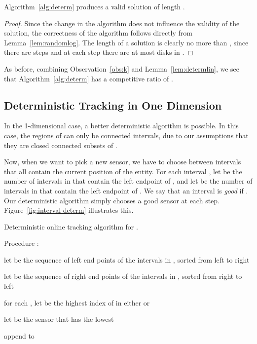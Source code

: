 \documentclass[runningheads]{llncs}
\begin{document}
      \begin {lemma} \label {lem:determlin}
        Algorithm~\ref {alg:determ} produces a valid solution of length .
      \end {lemma}
      
      \begin {proof}
        Since the change in the algorithm does not influence the validity of the solution, the correctness of the algorithm follows directly from Lemma~\ref {lem:randomlog}.
        The length of a solution is clearly no more than , since there are  steps and at each step there are at most  disks in .
      \end {proof}

      As before, combining Observation~\ref {obs:k} and Lemma~\ref {lem:determlin}, we see that Algorithm~\ref {alg:determ} has a competitive ratio of .
       
 \subsection {Deterministic Tracking in One Dimension}
In the 1-dimensional case, a better deterministic algorithm is possible. In this case, the regions of  can only be connected intervals, due to our assumptions that they are closed connected subsets of .
            
Now, when we want to pick a new sensor, we have to choose between  intervals that all contain the current position of the entity. For each interval , let  be the number of intervals in  that contain the left endpoint of , and let  be the number of intervals in  that contain the left endpoint of . We say that an interval  is \emph{good} if . Our deterministic algorithm simply chooses a good sensor at each step. Figure~\ref {fig:interval-determ} illustrates this.
      
      \begin {algorithm} [ht]
        \caption {Deterministic online tracking algorithm for .} \label {alg:determ1}
        Procedure :
        \begin {compactenum}
          \item let  be the sequence of left end points of the intervals in , sorted from left to right
          \item let  be the sequence of right end points of the intervals in , sorted from right to left
          \item for each , let  be the highest index of  in either  or 
          \item let  be the sensor that has the lowest 
          \item append  to 
        \end {compactenum}
      \end{algorithm}      
      
\end{document}
